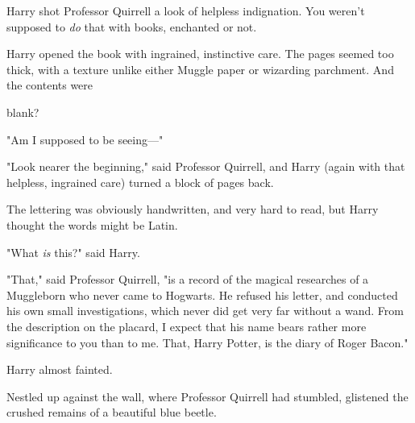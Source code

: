 Harry shot Professor Quirrell a look of helpless indignation. You weren't
supposed to \emph{do} that with books, enchanted or not.

Harry opened the book with ingrained, instinctive care. The pages seemed too
thick, with a texture unlike either Muggle paper or wizarding parchment. And
the contents were{\el}

{\el} blank?

"Am I supposed to be seeing\mbox{---}"

"Look nearer the beginning," said Professor Quirrell, and Harry (again with
that helpless, ingrained care) turned a block of pages back.

The lettering was obviously handwritten, and very hard to read, but Harry
thought the words might be Latin.

"What \emph{is} this?" said Harry.

"That," said Professor Quirrell, "is a record of the magical researches of a
Muggleborn who never came to Hogwarts. He refused his letter, and conducted his
own small investigations, which never did get very far without a wand. From the
description on the placard, I expect that his name bears rather more
significance to you than to me. That, Harry Potter, is the diary of Roger
Bacon."

Harry almost fainted.

Nestled up against the wall, where Professor Quirrell had stumbled, glistened
the crushed remains of a beautiful blue beetle.
